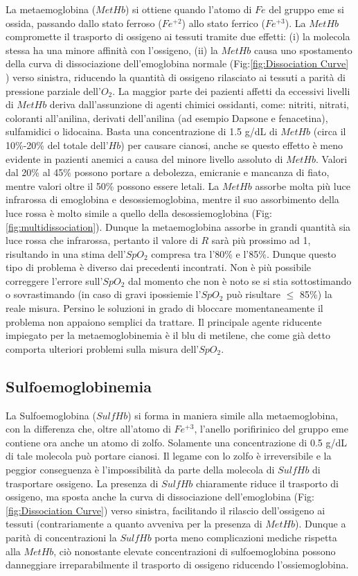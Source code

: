 \documentclass[a4paper, 12pt]{book}
\begin{document}
La metaemoglobina ($MetHb$) si ottiene quando l'atomo di $Fe$ del gruppo eme si ossida, passando dallo stato ferroso ($Fe^{+2}$) allo stato ferrico ($Fe^{+3}$).
La $MetHb$ compromette il trasporto di ossigeno ai tessuti tramite due effetti: (i) la molecola stessa ha una minore affinità con l'ossigeno, (ii) la $MetHb$ causa uno spostamento della curva di dissociazione dell'emoglobina normale (Fig:\ref{fig:Dissociation Curve} ) verso sinistra, riducendo la quantità di ossigeno rilasciato ai tessuti a parità di pressione parziale dell'$O_2$.
La maggior parte dei pazienti affetti da eccessivi livelli di $MetHb$ deriva dall'assunzione di agenti chimici ossidanti, come: nitriti, nitrati, coloranti all'anilina, derivati dell'anilina (ad esempio Dapsone e fenacetina), sulfamidici o lidocaina.
Basta una concentrazione di 1.5 g/dL di $MetHb$ (circa il 10\%-20\% del totale dell'$Hb$) per causare cianosi, anche se questo effetto è meno evidente in pazienti anemici a causa del minore livello assoluto di $MetHb$.
Valori dal 20\% al 45\% possono portare a debolezza, emicranie e mancanza di fiato, mentre valori oltre il 50\% possono essere letali.
La $MetHb$ assorbe molta più luce infrarossa di emoglobina e desossiemoglobina, mentre il suo assorbimento della luce rossa è molto simile a quello della desossiemoglobina (Fig:\ref{fig:multidissociation}).
Dunque la metaemoglobina assorbe in grandi quantità sia luce rossa che infrarossa, pertanto il valore di $R$ sarà più prossimo ad 1, risultando in una stima dell'$SpO_2$ compresa tra l'80\% e l'85\%.
Dunque questo tipo di problema è diverso dai precedenti incontrati.
Non è più possibile correggere l'errore sull'$SpO_2$  dal momento che non è noto se si stia sottostimando o sovrastimando (in caso di gravi ipossiemie l'$SpO_2$ può risultare $\leq$ 85\%) la reale misura.
Persino le soluzioni in grado di bloccare momentaneamente il problema non appaiono semplici da trattare.
Il principale agente riducente impiegato per la metaemoglobinemia è il blu di metilene, che come già detto comporta ulteriori problemi sulla misura dell'$SpO_2$.


\subsection{Sulfoemoglobinemia}

La Sulfoemoglobina ($SulfHb$) si forma in maniera simile alla metaemoglobina, con la differenza che, oltre all'atomo di $Fe^{+3}$, l'anello porifirinico del gruppo eme contiene ora anche un atomo di zolfo.
Solamente una concentrazione di 0.5 g/dL di tale molecola può portare cianosi.
Il legame con lo zolfo è irreversibile e la peggior conseguenza è l'impossibilità da parte della molecola di $SulfHb$ di trasportare ossigeno.
La presenza di $SulfHb$ chiaramente riduce il trasporto di ossigeno, ma sposta anche la curva di dissociazione dell'emoglobina (Fig:\ref{fig:Dissociation Curve}) verso sinistra, facilitando il rilascio dell'ossigeno ai tessuti (contrariamente a quanto avveniva per la presenza di $MetHb$).
Dunque a parità di concentrazioni la $SulfHb$ porta meno complicazioni mediche rispetta alla $MetHb$, ciò nonostante elevate concentrazioni di sulfoemoglobina possono danneggiare irreparabilmente il trasporto di ossigeno riducendo l'ossiemoglobina.
\end{document}
